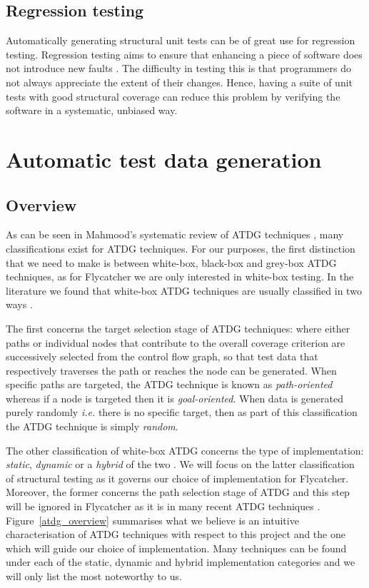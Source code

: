 \documentclass[a4paper,11pt,titlepage]{report}
\begin{document}
\subsection{Regression testing}
Automatically generating structural unit tests can be of great use for regression testing. Regression testing aims to ensure that enhancing a piece of software does not introduce new faults \cite{myers2011art}. The difficulty in testing this is that programmers do not always appreciate the extent of their changes. Hence, having a suite of unit tests with good structural coverage can reduce this problem by verifying the software in a systematic, unbiased way.

\section{Automatic test data generation}
\subsection{Overview}

As can be seen in Mahmood's systematic review of ATDG techniques \cite{mahmood2007systematic}, many classifications exist for ATDG techniques. For our purposes, the first distinction that we need to make is between white-box, black-box \cite{prasanna2005survey} and grey-box ATDG techniques, as for \textsf{Flycatcher} we are only interested in white-box testing. In the literature we found that white-box ATDG techniques are usually classified in two ways \cite{mahmood2007systematic, edvardsson1999survey, tahbildar2automated}.

The first concerns the target selection stage of ATDG techniques: where either paths or individual nodes that contribute to the overall coverage criterion are successively selected from the control flow graph, so that test data that respectively traverses the path or reaches the node can be generated. When specific paths are targeted, the ATDG technique is known as \emph{path-oriented} \cite{edvardsson1999survey} whereas if a node is targeted then it is \emph{goal-oriented}. When data is generated purely randomly \emph{i.e.} there is no specific target, then as part of this classification the ATDG technique is simply \emph{random}.

The other classification of white-box ATDG concerns the type of implementation: \emph{static}, \emph{dynamic} or a \emph{hybrid} of the two \cite{han2008empirical, mcminn2004search}. We will focus on the latter classification of structural testing as it governs our choice of implementation for \textsf{Flycatcher}. Moreover, the former concerns the path selection stage of ATDG and this step will be ignored in \textsf{Flycatcher} as it is in many recent ATDG techniques \cite{tahbildar2automated}. Figure~\ref{atdg_overview} summarises what we believe is an intuitive characterisation of ATDG techniques with respect to this project and the one which will guide our choice of implementation. Many techniques can be found under each of the static, dynamic and hybrid implementation categories and we will only list the most noteworthy to us.
\end{document}
